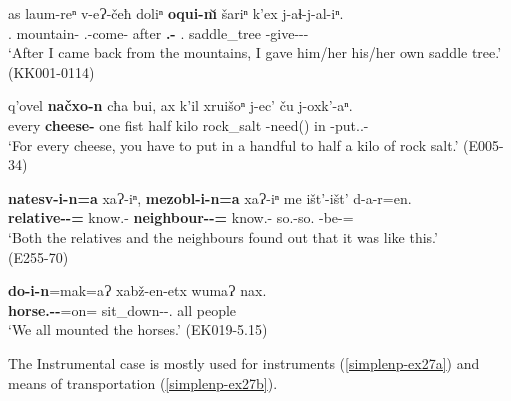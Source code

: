 \begin{exe}
	\ex\label{simplenp-ex24}
	\begin{xlist}
		
		
		
		   
			\ex\label{simplenp-ex24a}
			\gll as laum-reⁿ v-eɁ-čeħ doliⁿ \textbf{oqui-n\u{\i}} šariⁿ k'ex j-aɬ-j-al-iⁿ. \\
			{\Fsg}.{\Erg} mountain-{\Abl} {\M}.{\Sg}-come-{\Ante} after \textbf{{\Dist}.{\Obl}-{\Dat}} {\Refl}.{\Poss} saddle\_tree {\J}-give-{\J}-{\Intr}-{\Aor} \\
			\trans `After I came back from the mountains, I gave him/her his/her own saddle tree.'
			\hfill (KK001-0114)
		
		
		   
			\ex\label{simplenp-ex24d}
			\gll q'ovel \textbf{načxo-n} cħa bui, ax k'il xruišoⁿ j-ec' ču j-oxk'-aⁿ. \\
			every \textbf{cheese-{\Dat}} one fist half kilo rock\_salt {\J}-need({\Npst}) in {\J}-put.{\Pfv}.{\Pl}-{\Inf} \\
			\trans `For every cheese, you have to put in a handful to half a kilo of rock salt.'
			\hfill (E005-34)
		
		
		
		   
			\ex\label{simplenp-ex24b}
			\gll \textbf{natesv-i-n=a} xaɁ-iⁿ, \textbf{mezobl-i-n=a} xaɁ-iⁿ me išt'-išt' d-a-r=en. \\
			\textbf{relative-{\Pl}-{\Dat}={\Add}} know.{\Pfv}-{\Aor} \textbf{neighbour-{\Pl}-{\Dat}={\Add}} know.{\Pfv}-{\Aor} {\Subord} so.{\Prox}-so.{\Prox} {\D}-be-{{\Imprf}}={\Quot} \\
			\trans `Both the relatives and the neighbours found out that it was like this.' \\
			\hfill (E255-70)
		
		
		   
			\ex\label{simplenp-ex24c}
			\gll \textbf{do-i-n}=mak=aɁ xabž-en-etx wumaɁ nax. \\
			\textbf{horse.{\Obl}-{\Pl}-{\Dat}}=on={\Emph} sit\_down-{\Aor}-{\Fpl}.{\Erg} all people \\
			\trans `We all mounted the horses.'
			\hfill (EK019-5.15)
		
		
	\end{xlist}
\end{exe}

The Instrumental case is mostly used for instruments (\ref{simplenp-ex27a}) and means of transportation (\ref{simplenp-ex27b}). 

